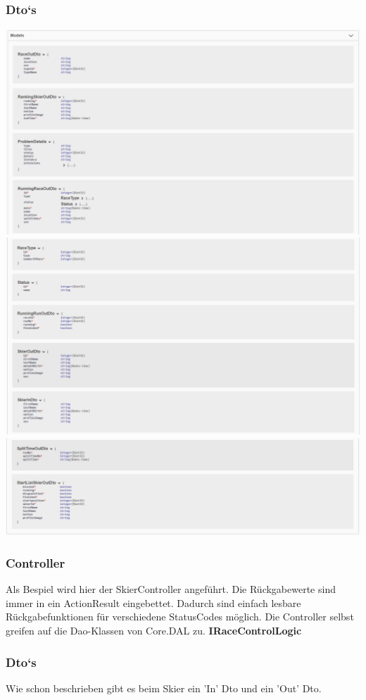 \documentclass[a4paper, 12pt]{article}
\begin{document}
	\subsubsection{Dto`s}
	\includegraphics[width=.7\textwidth]{img/Models_1.png}
	\newline		
	\includegraphics[width=.7\textwidth]{img/Models_2.png}
	\newline		
	\includegraphics[width=.7\textwidth]{img/Models_3.png}
	\newline		
	\subsubsection{Controller}
	Als Bespiel wird hier der SkierController angeführt. Die Rückgabewerte sind immer in ein ActionResult eingebettet. Dadurch sind einfach lesbare Rückgabefunktionen für verschiedene StatusCodes möglich. Die Controller selbst greifen auf die Dao-Klassen von Core.DAL zu.
	\textbf{IRaceControlLogic}
	
	\subsubsection{Dto`s}
	Wie schon beschrieben gibt es beim Skier ein 'In' Dto und ein 'Out' Dto.
	
	
\end{document}
